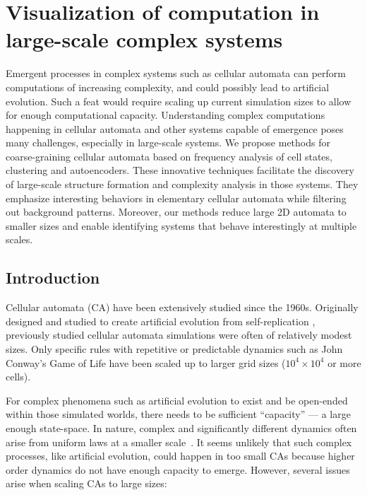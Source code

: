 \chapter{Visualization of computation in large-scale complex systems}
\label{cha:visu-comp-large}

  Emergent processes in complex systems such as cellular automata can perform
  computations of increasing complexity, and could possibly lead to artificial
  evolution. Such a feat would require scaling up current simulation sizes to
  allow for enough computational capacity. Understanding complex computations
  happening in cellular automata and other systems capable of emergence poses
  many challenges, especially in large-scale systems. We propose methods for
  coarse-graining cellular automata based on frequency analysis of cell states,
  clustering and autoencoders. These innovative techniques facilitate the
  discovery of large-scale structure formation and complexity analysis in those
  systems. They emphasize interesting behaviors in elementary cellular automata
  while filtering out background patterns. Moreover, our methods reduce large 2D
  automata to smaller sizes and enable identifying systems that behave
  interestingly at multiple scales.

\section{Introduction}
Cellular automata (CA) have been extensively studied since the 1960s. Originally
designed and studied to create artificial evolution from self-replication
\parencite{vonneumannTheorySelfreproducingAutomata1966,
  langtonSelfreproductionCellularAutomata1984}, previously studied cellular
automata simulations were often of relatively modest sizes. Only specific rules
with repetitive or predictable dynamics such as John Conway's Game of Life
\parencite{gardnerMathematicalGames1970} have been scaled up to larger grid sizes
($10^4 \times 10^4$ or more cells).

For complex phenomena such as artificial evolution to exist and be open-ended
within those simulated worlds, there needs to be sufficient ``capacity'' --- a
large enough state-space. In nature, complex and significantly different
dynamics often arise from uniform laws at a smaller
scale~\parencite{andersonMoreDifferent1972}. It seems unlikely that such complex
processes, like artificial evolution, could happen in too small CAs because
higher order dynamics do not have enough capacity to emerge. However, several
issues arise when scaling CAs to large sizes:

